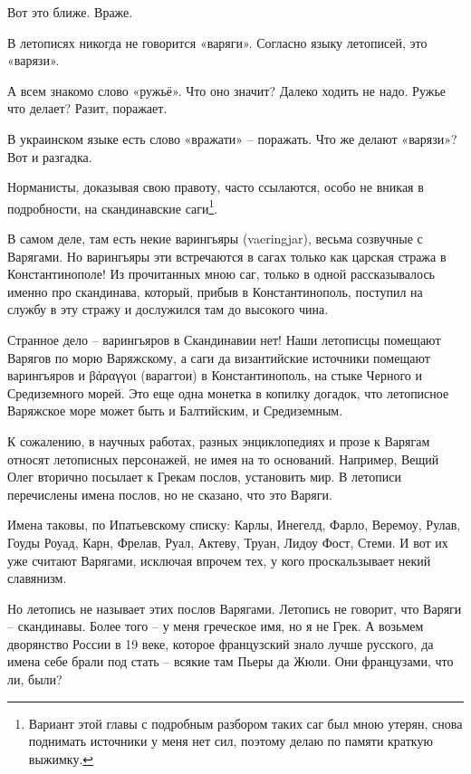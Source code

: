 Вот это ближе. Враже. 

В летописях никогда не говорится «варяги». Согласно языку летописей, это «варязи». 

А всем знакомо слово «ружьё». Что оно значит? Далеко ходить не надо. Ружье что делает? Разит, поражает.

В украинском языке есть слово «вражати» – поражать. Что же делают «варязи»? Вот и разгадка.

Норманисты, доказывая свою правоту, часто ссылаются, особо не вникая в подробности, на скандинавские саги\footnote{Вариант этой главы с подробным разбором таких саг был мною утерян, снова поднимать источники у меня нет сил, поэтому делаю по памяти краткую выжимку.}. 

В самом деле, там есть некие варингьяры (vaeringjar), весьма созвучные с Варягами. Но варингьяры эти встречаются в сагах только как царская стража в Константинополе! Из прочитанных мною саг, только в одной рассказывалось именно про скандинава, который, прибыв в Константинополь, поступил на службу в эту стражу и дослужился там до высокого чина.



Странное дело – варингьяров в Скандинавии нет! Наши летописцы помещают Варягов по морю Варяжскому, а саги да византийские источники помещают варингьяров и βάραγγοι (вараггои) в Константинополь, на стыке Черного и Средиземного морей. Это еще одна монетка в копилку догадок, что летописное Варяжское море может быть и Балтийским, и Средиземным. 

К сожалению, в научных работах, разных энциклопедиях и прозе к Варягам относят летописных персонажей, не имея на то оснований. Например, Вещий Олег вторично посылает к Грекам послов, установить мир. В летописи перечислены имена послов, но не сказано, что это Варяги. 

Имена таковы, по Ипатьевскому списку: Карлы, Инегелд, Фарло, Веремоу, Рулав, Гоуды Роуад, Карн, Фрелав, Руал, Актеву, Труан, Лидоу Фост, Стеми. И вот их уже считают Варягами, исключая впрочем тех, у кого проскальзывает некий славянизм.

Но летопись не называет этих послов Варягами. Летопись не говорит, что Варяги – скандинавы.  Более того – у меня греческое имя, но я не Грек. А возьмем дворянство России в 19 веке, которое французский знало лучше русского, да имена себе брали под стать – всякие там Пьеры да Жюли. Они французами, что ли, были? 

